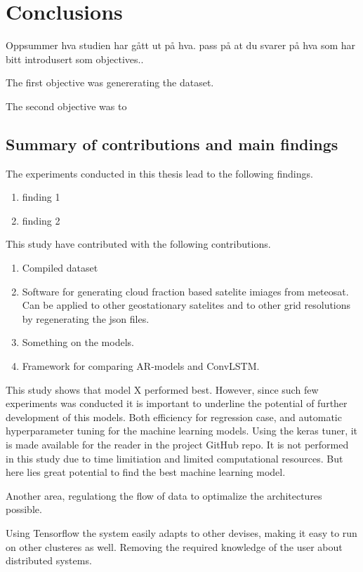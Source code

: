 \chapter{Conclusions}
Oppsummer hva studien har gått ut på hva. pass på at du svarer på hva som har bitt introdusert som objectives..

The first objective was genererating the dataset. 

The second objective was to 

\section{Summary of contributions and main findings }
The experiments conducted in this thesis lead to the following findings. 
\begin{enumerate}
    \item finding 1
    \item finding 2
\end{enumerate}

This study have contributed with the following contributions.
\begin{enumerate}
    \item Compiled dataset 
    \item Software for generating cloud fraction based satelite imiages from meteosat. Can be applied to other geostationary satelites and to other grid resolutions by regenerating the json files.
    \item Something on the models. 
    \item Framework for comparing AR-models and ConvLSTM.
\end{enumerate}

This study shows that model X performed best. However, since such few experiments was conducted it is important to underline the potential of further development of this models. Both efficiency for regression case, and automatic hyperparameter tuning for the machine learning models. Using the keras tuner, it is made available for the reader in the project GitHub repo. It is not performed in this study due to time limitiation and limited computational resources. But here lies great potential to find the best machine learning model. 

Another area, regulationg the flow of data to optimalize the architectures possible.

Using Tensorflow the system easily adapts to other devises, making it easy to run on other clusteres as well. Removing the required knowledge of the user about distributed systems. 



